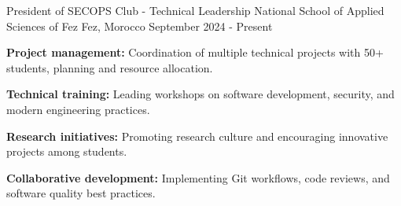 \begin{cventries}
    \cventry
    {President of SECOPS Club - Technical Leadership}
    {National School of Applied Sciences of Fez} %
    {Fez, Morocco} %
    {September 2024 - Present} %
    {
        \begin{cvitems}
            \item {\textbf{Project management:} Coordination of multiple technical projects with 50+ students, planning and resource allocation.}
            \item {\textbf{Technical training:} Leading workshops on software development, security, and modern engineering practices.}
            \item {\textbf{Research initiatives:} Promoting research culture and encouraging innovative projects among students.}
            \item {\textbf{Collaborative development:} Implementing Git workflows, code reviews, and software quality best practices.}
        \end{cvitems}
    }
\end{cventries}
